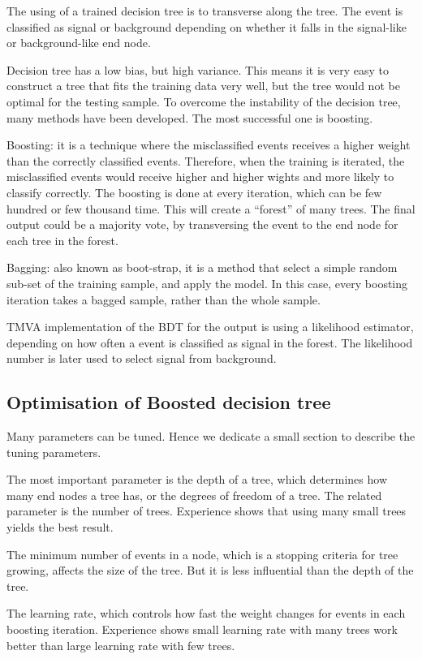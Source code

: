The using of a trained decision tree is to transverse along the tree. The event is classified as signal or background depending on whether it falls in the signal-like or background-like end node.

Decision tree has a low bias, but high variance. This means it is very easy to construct a tree that fits the training data very well, but the tree would not be optimal for the testing sample. To overcome the instability of the decision tree, many methods have been developed. The most successful one is boosting.

Boosting: it is a technique where the misclassified events receives a higher weight than the correctly classified events. Therefore, when the training is iterated, the misclassified events would receive higher and higher wights and more likely to classify correctly. The boosting is done at every iteration, which can be few hundred or few thousand time. This will create a ``forest'' of many trees. The final output could be a majority vote, by transversing the event to the end node for each tree in the forest.

Bagging: also known as boot-strap, it is a method that select a simple random sub-set of the training sample, and apply the model. In this case, every boosting iteration takes a bagged sample, rather than the whole sample.

TMVA implementation of the BDT for the output is using a likelihood estimator, depending on how often a event is classified as signal in the forest. The likelihood number is later used to select signal from background.

\subsection{Optimisation of Boosted decision tree}

Many parameters can be tuned. Hence we dedicate a small section to describe the tuning parameters.

The most important parameter is the depth of a tree, which determines how many end nodes a tree has, or the degrees of freedom of a tree. The related parameter is the number of trees. Experience shows that using many small trees yields the best result.

The minimum number of events in a node, which is a stopping criteria for tree growing, affects the size of the tree. But it is less influential than the depth of the tree.

The learning rate, which controls how fast the weight changes for events in each boosting iteration. Experience shows small learning rate with many trees work better than large learning rate with few trees.

